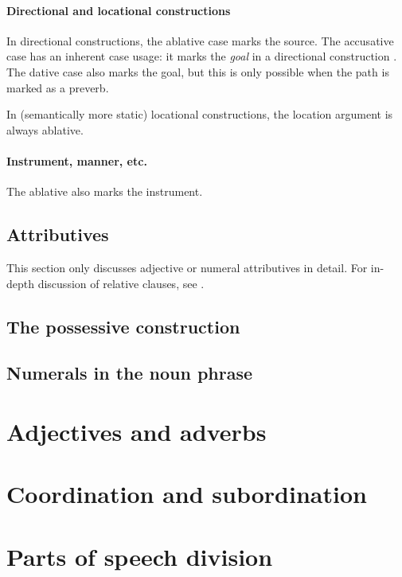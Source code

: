 \documentclass[a4paper, oneside, 12pt]{report}
\newcommand*{\citepage}[1]{p.~{#1}}
\newcommand*{\term}[1]{\emph{#1}}
\begin{document}
\paragraph*{Directional and locational constructions}
In directional constructions, the ablative case marks the source.
The accusative case has an inherent case usage:
it marks the \term{goal} in a directional construction
\citep[\citepage{238}]{oniga2014latin}.
The dative case also marks the goal,
but this is only possible when the path is marked as a preverb.

In (semantically more static) locational constructions,
the location argument is always ablative.

\paragraph*{Instrument, manner, etc.}
The ablative also marks the instrument.

\subsection{Attributives}

This section only discusses adjective or numeral attributives in detail.
For in-depth discussion of relative clauses, see .


\subsection{The possessive construction}

\subsection{Numerals in the noun phrase}



\section{Adjectives and adverbs}


\section{Coordination and subordination}

\section{Parts of speech division}\label{sec:grammatical.pos}
\end{document}
